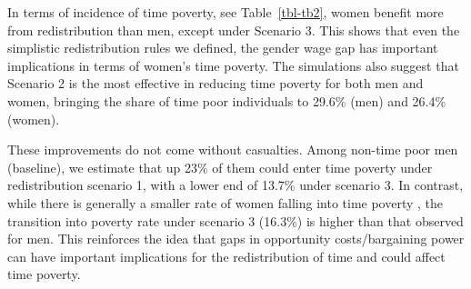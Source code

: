 \documentclass[
  11pt,
]{article}
\begin{document}
\begin{table}

\caption{\label{tbl-tb2}Time Poverty and Transition Rates}


\end{table}%

In terms of incidence of time poverty, see Table~\ref{tbl-tb2}, women
benefit more from redistribution than men, except under Scenario 3. This
shows that even the simplistic redistribution rules we defined, the
gender wage gap has important implications in terms of women's time
poverty. The simulations also suggest that Scenario 2 is the most
effective in reducing time poverty for both men and women, bringing the
share of time poor individuals to 29.6\% (men) and 26.4\%(women).

These improvements do not come without casualties. Among non-time poor
men (baseline), we estimate that up 23\% of them could enter time
poverty under redistribution scenario 1, with a lower end of 13.7\%
under scenario 3. In contrast, while there is generally a smaller rate
of women falling into time poverty , the transition into poverty rate
under scenario 3 (16.3\%) is higher than that observed for men. This
reinforces the idea that gaps in opportunity costs/bargaining power can
have important implications for the redistribution of time and could
affect time poverty.
\end{document}
